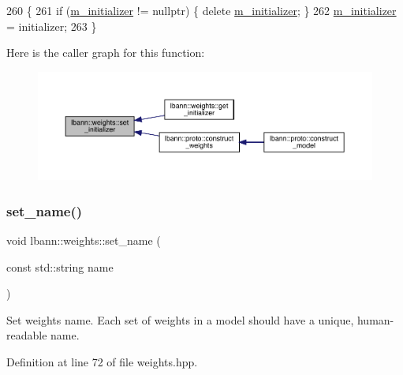 \begin{DoxyCode}
260                                                               \{
261   \textcolor{keywordflow}{if} (\hyperlink{classlbann_1_1weights_a3ddbcce8d543e975efeebdb43e82444c}{m\_initializer} != \textcolor{keyword}{nullptr}) \{ \textcolor{keyword}{delete} \hyperlink{classlbann_1_1weights_a3ddbcce8d543e975efeebdb43e82444c}{m\_initializer}; \}
262   \hyperlink{classlbann_1_1weights_a3ddbcce8d543e975efeebdb43e82444c}{m\_initializer} = initializer;
263 \}
\end{DoxyCode}
Here is the caller graph for this function\+:\nopagebreak
\begin{figure}[H]
\begin{center}
\leavevmode
\includegraphics[width=350pt]{classlbann_1_1weights_a71e56d32d8e9c0e3ddf0ec2d0cd3924d_icgraph}
\end{center}
\end{figure}
\mbox{\label{classlbann_1_1weights_ab886e4d3ff62b62a7ac6c52e391666f2}} 
\subsubsection{\texorpdfstring{set\+\_\+name()}{set\_name()}}
{\footnotesize\ttfamily void lbann\+::weights\+::set\+\_\+name (\begin{DoxyParamCaption}\item[{const std\+::string}]{name }\end{DoxyParamCaption})\hspace{0.3cm}{\ttfamily [inline]}}

Set weights name. Each set of weights in a model should have a unique, human-\/readable name. 

Definition at line 72 of file weights.\+hpp.


